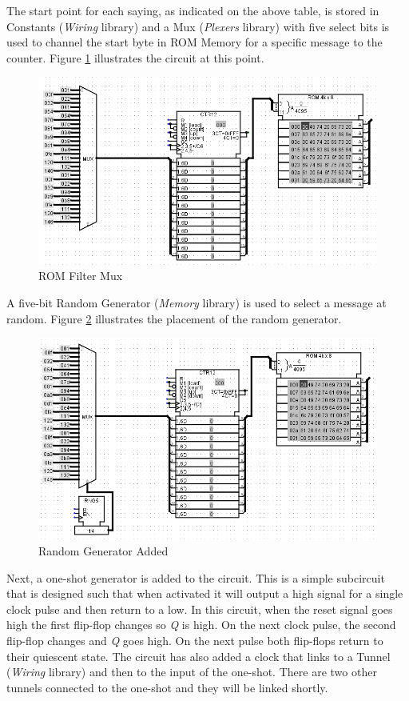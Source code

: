 The start point for each saying, as indicated on the above table, is stored in Constants (\textit{Wiring} library) and a Mux (\textit{Plexers} library) with five select bits is used to channel the start byte in ROM Memory for a specific message to the counter. Figure \ref{fig:09-03} illustrates the circuit at this point.

\begin{figure}[H]
	\centering
	\includegraphics[width=\maxwidth{.95\linewidth}]{gfx/09-03}
	\caption{ROM Filter Mux}
	\label{fig:09-03}
\end{figure}

A five-bit Random Generator (\textit{Memory} library) is used to select a message at random. Figure \ref{fig:09-04} illustrates the placement of the random generator.

\begin{figure}[H]
	\centering
	\includegraphics[width=\maxwidth{.95\linewidth}]{gfx/09-04}
	\caption{Random Generator Added}
	\label{fig:09-04}
\end{figure}

Next, a one-shot generator is added to the circuit. This is a simple subcircuit that is designed such that when activated it will output a high signal for a single clock pulse and then return to a low. In this circuit, when the reset signal goes high the first flip-flop changes so \textit{Q} is high. On the next clock pulse, the second flip-flop changes and \textit{Q} goes high. On the next pulse both flip-flops return to their quiescent state. The circuit has also added a clock that links to a Tunnel (\textit{Wiring} library) and then to the input of the one-shot. There are two other tunnels connected to the one-shot and they will be linked shortly.

